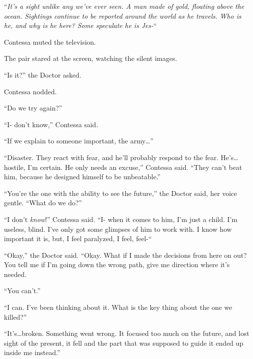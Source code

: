 \blacksquare



``\emph{It's a sight unlike any we've ever seen.  A man made of gold, floating above the ocean.  Sightings continue to be reported around the world as he travels.  Who is he, and why is he here?  Some speculate he is Jes-}``



Contessa muted the television.



The pair stared at the screen, watching the silent images.



``Is it?''  the Doctor asked.



Contessa nodded.



``Do we try again?''



``I- don't know,'' Contessa said.



``If we explain to someone important, the army\ldots''



``Disaster.  They react with fear, and he'll probably respond to the fear.  He's\ldots hostile, I'm certain.  He only needs an excuse,'' Contessa said.  ``They can't beat him, because he designed himself to be unbeatable.''



``You're the one with the ability to see the future,'' the Doctor said, her voice gentle.  ``What do we do?''



``I don't \emph{know}!''  Contessa said.  ``I- when it comes to him, I'm just a child.  I'm useless, blind.  I've only got some glimpses of him to work with.  I know how important it is, but, I feel paralyzed, I feel, feel-``



``Okay,'' the Doctor said.  ``Okay.  What if I made the decisions from here on out?  You tell me if I'm going down the wrong path, give me direction where it's needed.



``You can't.''



``I can.  I've been thinking about it.  What is the key thing about the one we killed?''



``It's\ldots broken.  Something went wrong.  It focused too much on the future, and lost sight of the present, it fell and the part that was supposed to guide it ended up inside me instead.''



